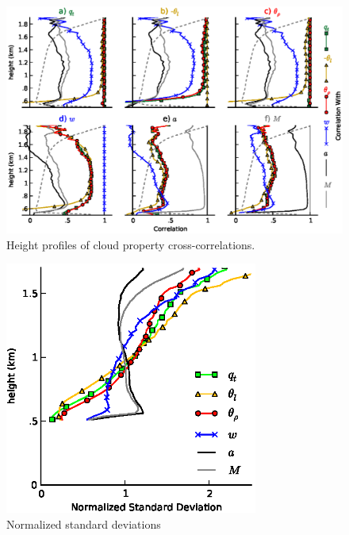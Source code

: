 \documentclass[acp]{copernicus}
\begin{document}
\begin{figure}[t]
\vspace*{2mm}
\begin{center}
\includegraphics[width=\textwidth]{./figures/cloud_autocorrelation}
\end{center}
\caption{Height profiles of cloud property cross-correlations.}
\label{fig:cloud_autocorrelation}
\end{figure}

\begin{figure}[t]
\vspace*{2mm}
\begin{center}
\includegraphics[width=8.3cm]{./figures/st_dev}
\end{center}
\caption{Normalized standard deviations}
\label{fig:st_dev}
\end{figure}
\end{document}
